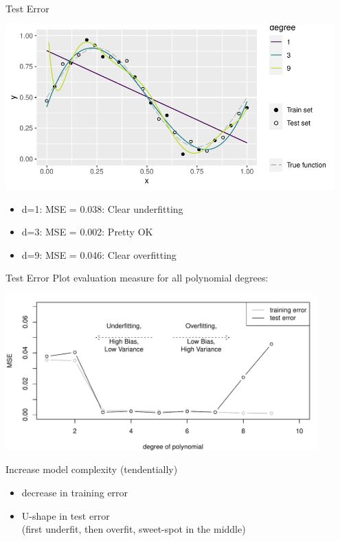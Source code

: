 \begin{vbframe}{Test Error}
\begin{knitrout}\scriptsize
{}\color{fgcolor}

{\centering \includegraphics[width=0.95\textwidth]{figure/eval_test_2} 

}



\end{knitrout}

\begin{itemize}
\item d=1: MSE = 0.038: Clear underfitting
\item d=3: MSE = 0.002: Pretty OK
\item d=9: MSE = 0.046: Clear overfitting
\end{itemize}

\end{vbframe}


\begin{vbframe}{Test Error}
Plot evaluation measure for all polynomial degrees:
\begin{knitrout}\scriptsize
{}\color{fgcolor}

{\centering \includegraphics[width=0.9\textwidth]{figure/eval_test_3} 

}



\end{knitrout}

Increase model complexity (tendentially)
\begin{itemize}
\item decrease in training error\\
\item U-shape in test error\\ 
(first underfit, then overfit, sweet-spot in the middle)
\end{itemize}
\end{vbframe}

